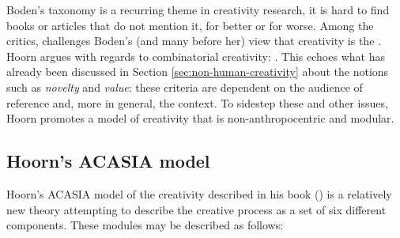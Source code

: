 Boden's taxonomy is a recurring theme in creativity research, it is hard to find books or articles that do not mention it, for better or for worse. Among the critics, \cite{Hoorn2023} challenges Boden's (and many before her) view that creativity is the . Hoorn argues with regards to combinatorial creativity: . This echoes what has already been discussed in Section \ref{sec:non-human-creativity} about the notions such as \emph{novelty} and \emph{value}: these criteria are dependent on the audience of reference and, more in general, the context. To sidestep these and other issues, Hoorn promotes a model of creativity that is non-anthropocentric and modular.

\subsection{Hoorn's ACASIA model}

Hoorn's ACASIA model of the creativity described in his book  (\citeyear{Hoorn2014}) is a relatively new theory attempting to describe the creative process as a set of six different components. These modules may be described as follows:

